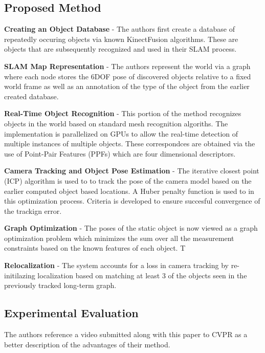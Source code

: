 \documentclass[10pt,twocolumn,letterpaper]{article}
\begin{document}
\subsection{Proposed Method}

\textbf{Creating an Object Database} - 
The authors first create a database of repeatedly occuring objects via known KinectFusion algorithms. These are objects that are subsequently recognized and used in their SLAM process. 

\textbf{SLAM Map Representation} - 
The authors represent the world via a graph where each node stores the 6DOF pose of discovered objects relative to a fixed world frame as well as an annotation of the type of the object from the earlier created database. 

\textbf{Real-Time Object Recognition} - 
This portion of the method recognizes objects in the world based on standard mesh recognition algoriths. The implementation is parallelized on GPUs to allow the real-time detection of multiple instances of multiple objects. These correspondces are obtained via the use of Point-Pair Features (PPFs) which are four dimensional descriptors. 

\textbf{Camera Tracking and Object Pose Estimation} - 
The iterative closest point (ICP) algorithm is used to to track the pose of the camera model based on the earlier computed object based locations. A Huber penalty function is used to in this optimization process. Criteria is developed to ensure succesful convergence of the trackign error.

\textbf{Graph Optimization} - 
The poses of the static object is now viewed as a graph optimization problem which minimizes the sum over all the measurement constraints based on the known features of each object. T

\textbf{Relocalization} - 
The system accounts for a loss in camera tracking by re-initilazing localization based on matching at least 3 of the objects seen in the previously tracked long-term graph. 

\subsection{Experimental Evaluation}
The authors reference a video submitted along with this paper to CVPR as a better description of the advantages of their method. 
\end{document}
